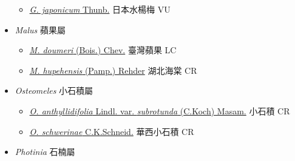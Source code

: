 \begin{itemize}
  \begin{itemize}
        \item[] \href{http://www.theplantlist.org/tpl1.1/search?q=Geum+japonicum}{\textit{G. japonicum} Thunb.}   日本水楊梅 VU
  \end{itemize}
 \item[] \textit{Malus} 蘋果屬
                    
  \begin{itemize}
        \item[] \href{http://www.theplantlist.org/tpl1.1/search?q=Malus+doumeri}{\textit{M. doumeri} (Bois.) Chev.}   臺灣蘋果 LC
        \item[] \href{http://www.theplantlist.org/tpl1.1/search?q=Malus+hupehensis}{\textit{M. hupehensis} (Pamp.) Rehder}   湖北海棠 CR
  \end{itemize}
 \item[] \textit{Osteomeles} 小石積屬
                    
  \begin{itemize}
        \item[] \href{http://www.theplantlist.org/tpl1.1/search?q=Osteomeles+anthyllidifolia+var.+subrotunda}{\textit{O. anthyllidifolia} Lindl. var. \textit{subrotunda} (C.Koch) Masam.}   小石積 CR
        \item[] \href{http://www.theplantlist.org/tpl1.1/search?q=Osteomeles+schwerinae}{\textit{O. schwerinae} C.K.Schneid.}   華西小石積 CR
  \end{itemize}
 \item[] \textit{Photinia} 石楠屬
                    

\end{itemize}
